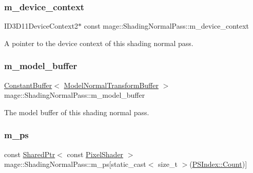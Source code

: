 \subsubsection{\texorpdfstring{m\+\_\+device\+\_\+context}{m\_device\_context}}
{\footnotesize\ttfamily I\+D3\+D11\+Device\+Context2$\ast$ const mage\+::\+Shading\+Normal\+Pass\+::m\+\_\+device\+\_\+context\hspace{0.3cm}{\ttfamily [private]}}

A pointer to the device context of this shading normal pass. \hypertarget{classmage_1_1_shading_normal_pass_a948daea5dea9b2cd2b2eaf30a1341231}{}\label{classmage_1_1_shading_normal_pass_a948daea5dea9b2cd2b2eaf30a1341231} 
\subsubsection{\texorpdfstring{m\+\_\+model\+\_\+buffer}{m\_model\_buffer}}
{\footnotesize\ttfamily \hyperlink{structmage_1_1_constant_buffer}{Constant\+Buffer}$<$ \hyperlink{structmage_1_1_model_normal_transform_buffer}{Model\+Normal\+Transform\+Buffer} $>$ mage\+::\+Shading\+Normal\+Pass\+::m\+\_\+model\+\_\+buffer\hspace{0.3cm}{\ttfamily [private]}}

The model buffer of this shading normal pass. \hypertarget{classmage_1_1_shading_normal_pass_a3dbbd1bd2612ccaec66c551f251a47e9}{}\label{classmage_1_1_shading_normal_pass_a3dbbd1bd2612ccaec66c551f251a47e9} 
\subsubsection{\texorpdfstring{m\+\_\+ps}{m\_ps}}
{\footnotesize\ttfamily const \hyperlink{namespacemage_a1e01ae66713838a7a67d30e44c67703e}{Shared\+Ptr}$<$ const \hyperlink{namespacemage_a27ecaf266420ee7a494d64edc0757129}{Pixel\+Shader} $>$ mage\+::\+Shading\+Normal\+Pass\+::m\+\_\+ps\mbox{[}static\+\_\+cast$<$ size\+\_\+t $>$(\hyperlink{classmage_1_1_shading_normal_pass_a6d277753d26a7854c448b3e0d9275b19ae93f994f01c537c4e2f7d8528c3eb5e9}{P\+S\+Index\+::\+Count})\mbox{]}\hspace{0.3cm}{\ttfamily [private]}}

